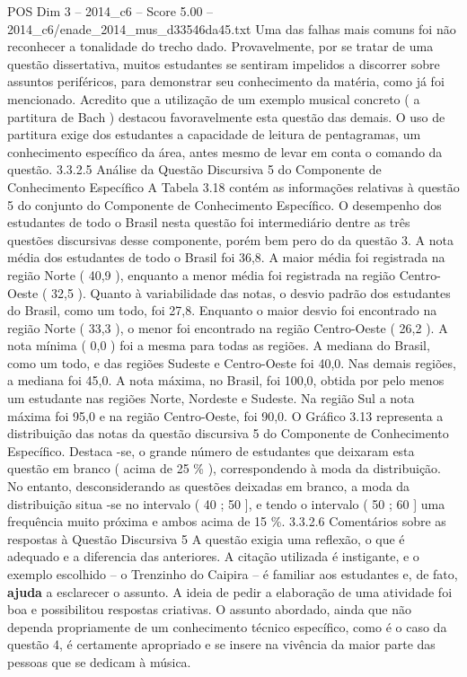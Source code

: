 \begin{textsample}{POS Dim 3 – 2014\_c6 – Score 5.00 – 2014\_c6/enade\_2014\_mus\_d33546da45.txt}
Uma das falhas mais comuns foi não reconhecer a tonalidade do trecho dado.
Provavelmente, por se tratar de uma questão dissertativa, muitos estudantes se sentiram impelidos a discorrer sobre assuntos periféricos, para demonstrar seu conhecimento da matéria, como já foi mencionado.
Acredito que a utilização de um exemplo musical concreto ( a partitura de Bach ) destacou favoravelmente esta questão das demais.
O uso de partitura exige dos estudantes a capacidade de leitura de pentagramas, um conhecimento específico da área, antes mesmo de levar em conta o comando da questão. 3.3.2.5 Análise da Questão Discursiva 5 do Componente de Conhecimento Específico A Tabela 3.18 contém as informações relativas à questão 5 do conjunto do Componente de Conhecimento Específico.
O desempenho dos estudantes de todo o Brasil nesta questão foi intermediário dentre as três questões discursivas desse componente, porém bem pero do da questão 3.
A nota média dos estudantes de todo o Brasil foi 36,8.
A maior média foi registrada na região Norte ( 40,9 ), enquanto a menor média foi registrada na região Centro-Oeste ( 32,5 ).
Quanto à variabilidade das notas, o desvio padrão dos estudantes do Brasil, como um todo, foi 27,8.
Enquanto o maior desvio foi encontrado na região Norte ( 33,3 ), o menor foi encontrado na região Centro-Oeste ( 26,2 ).
A nota mínima ( 0,0 ) foi a mesma para todas as regiões.
A mediana do Brasil, como um todo, e das regiões Sudeste e Centro-Oeste foi 40,0.
Nas demais regiões, a mediana foi 45,0.
A nota máxima, no Brasil, foi 100,0, obtida por pelo menos um estudante nas regiões Norte, Nordeste e Sudeste.
Na região Sul a nota máxima foi 95,0 e na região Centro-Oeste, foi 90,0.
O Gráfico 3.13 representa a distribuição das notas da questão discursiva 5 do Componente de Conhecimento Específico.
Destaca -se, o grande número de estudantes que deixaram esta questão em branco ( acima de 25 \% ), correspondendo à moda da distribuição.
No entanto, desconsiderando as questões deixadas em branco, a moda da distribuição situa -se no intervalo ( 40 ; 50 ], e tendo o intervalo ( 50 ; 60 ] uma frequência muito próxima e ambos acima de 15 \%. 3.3.2.6 Comentários sobre as respostas à Questão Discursiva 5 A questão exigia uma reflexão, o que é adequado e a diferencia das anteriores.
A citação utilizada é instigante, e o exemplo escolhido – o Trenzinho do Caipira – é familiar aos estudantes e, de fato, \textbf{ajuda} a esclarecer o assunto.
A ideia de pedir a elaboração de uma atividade foi boa e possibilitou respostas criativas.
O assunto abordado, ainda que não dependa propriamente de um conhecimento técnico específico, como é o caso da questão 4, é certamente apropriado e se insere na vivência da maior parte das pessoas que se dedicam à música.

\end{textsample}
